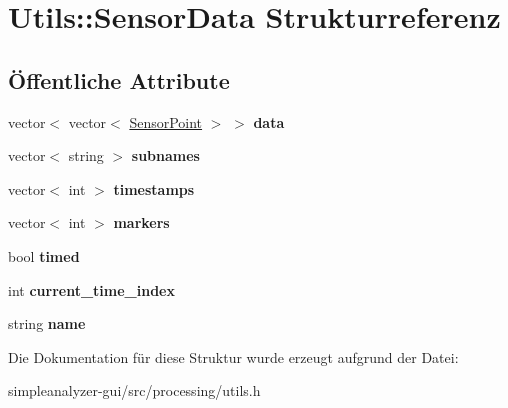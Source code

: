 \hypertarget{structUtils_1_1SensorData}{\section{Utils\-:\-:Sensor\-Data Strukturreferenz}
\label{structUtils_1_1SensorData}
}
\subsection*{Öffentliche Attribute}
\begin{DoxyCompactItemize}
\item 
\hypertarget{structUtils_1_1SensorData_ae94e7645dc0b6adfd21571b0abd5e309}{vector$<$ vector$<$ \hyperlink{structUtils_1_1SensorPoint}{Sensor\-Point} $>$ $>$ {\bfseries data}}\label{structUtils_1_1SensorData_ae94e7645dc0b6adfd21571b0abd5e309}

\item 
\hypertarget{structUtils_1_1SensorData_ad5875ab7e8ebdc9dc41a7b9ef1c063ba}{vector$<$ string $>$ {\bfseries subnames}}\label{structUtils_1_1SensorData_ad5875ab7e8ebdc9dc41a7b9ef1c063ba}

\item 
\hypertarget{structUtils_1_1SensorData_a654f9606c3ddc6e93afb86a116d11ea5}{vector$<$ int $>$ {\bfseries timestamps}}\label{structUtils_1_1SensorData_a654f9606c3ddc6e93afb86a116d11ea5}

\item 
\hypertarget{structUtils_1_1SensorData_ac2d7e037f39affd6ad9d4aa29ed579da}{vector$<$ int $>$ {\bfseries markers}}\label{structUtils_1_1SensorData_ac2d7e037f39affd6ad9d4aa29ed579da}

\item 
\hypertarget{structUtils_1_1SensorData_aca94c3ec7e8f2e719f7cfcff4e9da41b}{bool {\bfseries timed}}\label{structUtils_1_1SensorData_aca94c3ec7e8f2e719f7cfcff4e9da41b}

\item 
\hypertarget{structUtils_1_1SensorData_a177d53154d56fcf1962f969ece1e7d9d}{int {\bfseries current\-\_\-time\-\_\-index}}\label{structUtils_1_1SensorData_a177d53154d56fcf1962f969ece1e7d9d}

\item 
\hypertarget{structUtils_1_1SensorData_a52474d0fe0dce0d3ee73c007a150a507}{string {\bfseries name}}\label{structUtils_1_1SensorData_a52474d0fe0dce0d3ee73c007a150a507}

\end{DoxyCompactItemize}


Die Dokumentation für diese Struktur wurde erzeugt aufgrund der Datei\-:\begin{DoxyCompactItemize}
\item 
simpleanalyzer-\/gui/src/processing/utils.\-h\end{DoxyCompactItemize}
